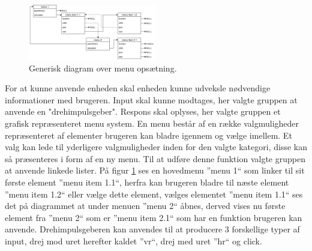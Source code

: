 \begin{figure}
	\centering 
	\includegraphics[width=0.5\textwidth]{billeder/menuesdiagram.png} 
	\caption{Generisk diagram over menu opsætning. } 
	\label{fig:menuesdiagram} 
\end{figure}
For at kunne anvende enheden skal enheden kunne udveksle nødvendige informationer med brugeren. 
Input skal kunne modtages, her valgte gruppen at anvende en "drehimpulsgeber".
Respons skal oplyses, her valgte gruppen et grafisk repræsenteret menu system.
En menu består af en række valgmuligheder repræsenteret af elementer brugeren kan bladre igennem og vælge imellem.
Et valg kan lede til yderligere valgmuligheder inden for den valgte kategori, disse kan så præsenteres i form af en ny menu.
Til at udføre denne funktion valgte gruppen at anvende linkede lister.\newline
På figur \ref{fig:menuesdiagram} ses en hovedmenu ''menu 1`` som linker til sit første element ''menu item 1.1``, herfra kan brugeren bladre til næste element ''menu item 1.2`` eller vælge dette element, vælges elementet ''menu item 1.1`` ses det på diagrammet at under menuen ''menu 2`` åbnes, derved vises nu første element fra ''menu 2`` som er ''menu item 2.1`` som har en funktion brugeren kan anvende.
Drehimpulsgeberen kan anvendes til at producere 3 forskellige typer af input, drej mod uret herefter kaldet ''vr``, drej med uret ''hr`` og click.

